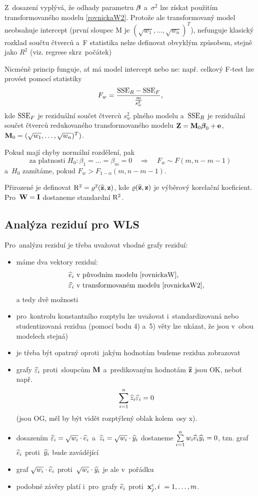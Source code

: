 Z~dosazení vyplývá, že odhady parametru $\boldsymbol{\beta}$ a~$\sigma^2$ lze získat použitím transformovaného modelu \eqref{rovnickaW2}. Protože ale transformovaný model neobsahuje intercept (první sloupec M je $(\sqrt{w_1},\dots, \sqrt{w_n})^T$), nefunguje klasický rozklad součtu čtverců a~F statistika nelze definovat obvyklým způsobem, stejně jako $R^2$ (viz. regrese skrz~počátek)

Nicméně princip  funguje, ať má model intercept nebo ne: např. celkový F-test lze provést pomocí statistiky
$$ F_w = \frac{\mathrm{SSE}_R - \mathrm{SSE}_F}{\frac{m}{s_w^2}}, $$
kde $\mathrm{SSE}_F$ je reziduální součet čtverců $s_w^2$ plného modelu a~$\mathrm{SSE}_R$ je reziduální součet čtverců redukovaného transformovaného modelu $\textbf{Z} = \textbf{M}_0 \boldsymbol{\beta}_0 + \mathbf{e}$, $\textbf{M}_0 = (\sqrt{w_1},\dots, \sqrt{w_n})^T)$.
	
Pokud mají chyby normální rozdělení, pak
$$\text{za platnosti } H_0: \beta_1 = \dots = \beta_m = 0 \quad \Rightarrow \quad F_w \sim F(m, n-m-1)$$
a~$H_0$ zamítáme, pokud $F_w > F_{1-\alpha}(m,n-m-1)$.
	
Přirozené je definovat $\mathrm{R}^2 = \varrho^2(\widehat{\mathbf{z}}, \mathbf{z})$, kde $\varrho(\widehat{\mathbf{z}}, \mathbf{z})$ je výběrový korelační koeficient. Pro~$\textbf{W} = \textbf{I}$ dostaneme standardní $\mathrm{R}^2$.
	
\subsection{Analýza reziduí pro WLS}
	Pro~analýzu reziduí je třeba uvažovat vhodné grafy reziduí:
	\begin{itemize}
		\item máme dva vektory reziduí:
		\begin{align*}
			& \widehat{e}_i \text{ v~původním modelu \eqref{rovnickaW}}, \\
			& \widehat{\varepsilon}_i \text{ v~transformovaném modelu \eqref{rovnickaW2}},
		\end{align*}
		a tedy dvě možnosti
		\item pro~kontrolu konstantního rozptylu lze uvažovat i~standardizovaná nebo studentizovaná rezidua (pomocí bodu 4) a~5) věty lze ukázat, že jsou v~obou modelech stejná)
		\item je třeba být opatrný oproti~jakým hodnotám budeme rezidua zobrazovat
		\item grafy $\widehat{\varepsilon}_i$ proti~sloupcům $\textbf{M}$ a~predikovaným hodnotám $\widehat{\mathbf{z}}$ jsou OK, neboť např.
		 $$
		\sum\limits_{i=1}^{n} \widehat{z}_i \widehat{\varepsilon}_i = 0
		 $$
		(jsou OG, měl by být vidět rozptýlený oblak kolem~osy x).
		\item dosazením $\widehat{\varepsilon}_i = \sqrt{w_i}  \cdot \widehat{e}_i$ a~$\widehat{z}_i = \sqrt{w_i} \cdot \widehat{y}_i$ dostaneme $\sum\limits_{i=1}^{n} w_i \widehat{e}_i \widehat{y}_i = 0$, tzn. graf $\widehat{e}_i$ proti~$\widehat{y}_i$ bude zavádějící
		\item graf $\sqrt{w_i}  \cdot \widehat{e}_i$ proti~$\sqrt{w_i}  \cdot \widehat{y}_i$ je ale v~pořádku
		\item podobné závěry platí i~pro~grafy $\widehat{e}_i$ proti~$\mathbf{x}_j^c, i~ = 1,\dots, m$.
	\end{itemize}


